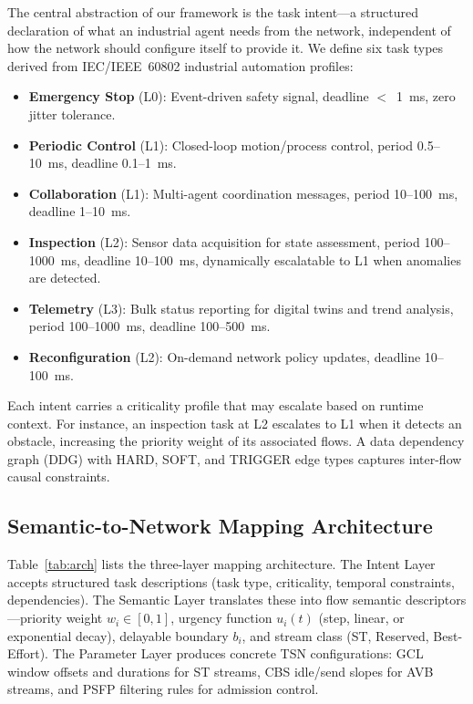 \documentclass[conference]{IEEEtran}
\begin{document}
The central abstraction of our framework is the task intent---a structured declaration of what an industrial agent needs from the network, independent of how the network should configure itself to provide it. We define six task types derived from IEC/IEEE~60802 industrial automation profiles:

\begin{itemize}
\item \textbf{Emergency Stop} (L0): Event-driven safety signal, deadline $<$~1~ms, zero jitter tolerance.
\item \textbf{Periodic Control} (L1): Closed-loop motion/process control, period 0.5--10~ms, deadline 0.1--1~ms.
\item \textbf{Collaboration} (L1): Multi-agent coordination messages, period 10--100~ms, deadline 1--10~ms.
\item \textbf{Inspection} (L2): Sensor data acquisition for state assessment, period 100--1000~ms, deadline 10--100~ms, dynamically escalatable to L1 when anomalies are detected.
\item \textbf{Telemetry} (L3): Bulk status reporting for digital twins and trend analysis, period 100--1000~ms, deadline 100--500~ms.
\item \textbf{Reconfiguration} (L2): On-demand network policy updates, deadline 10--100~ms.
\end{itemize}

Each intent carries a criticality profile that may escalate based on runtime context. For instance, an inspection task at L2 escalates to L1 when it detects an obstacle, increasing the priority weight of its associated flows. A data dependency graph (DDG) with HARD, SOFT, and TRIGGER edge types captures inter-flow causal constraints.

\subsection{Semantic-to-Network Mapping Architecture}

Table~\ref{tab:arch} lists the three-layer mapping architecture. The Intent Layer accepts structured task descriptions (task type, criticality, temporal constraints, dependencies). The Semantic Layer translates these into flow semantic descriptors---priority weight $w_i \in [0,1]$, urgency function $u_i(t)$ (step, linear, or exponential decay), delayable boundary $b_i$, and stream class (ST, Reserved, Best-Effort). The Parameter Layer produces concrete TSN configurations: GCL window offsets and durations for ST streams, CBS idle/send slopes for AVB streams, and PSFP filtering rules for admission control.
\end{document}
